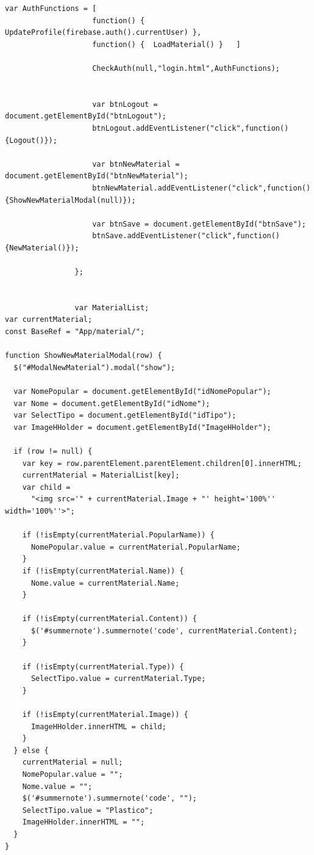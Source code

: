 \documentclass[
	12pt,				%
	openright,			%
	twoside,			%
	a4paper,			%
	english,			%
	french,				%
	spanish,			%
	brazil				%
	]{abntex2}
\begin{document}
\begin{apendicesenv}
\begin{lstlisting}[numbers=none,
basicstyle=\small,
caption={Material.js},
title={Material.js},
label={Material.js}]
                    var AuthFunctions = [   
                    function() {  UpdateProfile(firebase.auth().currentUser) },
                    function() {  LoadMaterial() }   ]                    
                    
                    CheckAuth(null,"login.html",AuthFunctions);                   
                    
                    
                    var btnLogout = document.getElementById("btnLogout");
                    btnLogout.addEventListener("click",function(){Logout()}); 
                    
                    var btnNewMaterial = document.getElementById("btnNewMaterial");
                    btnNewMaterial.addEventListener("click",function(){ShowNewMaterialModal(null)}); 
                    
                    var btnSave = document.getElementById("btnSave");
                    btnSave.addEventListener("click",function(){NewMaterial()});    
                    
                };


                var MaterialList;
var currentMaterial;
const BaseRef = "App/material/";

function ShowNewMaterialModal(row) {
  $("#ModalNewMaterial").modal("show");

  var NomePopular = document.getElementById("idNomePopular");
  var Nome = document.getElementById("idNome"); 
  var SelectTipo = document.getElementById("idTipo");
  var ImageHHolder = document.getElementById("ImageHHolder");

  if (row != null) {
    var key = row.parentElement.parentElement.children[0].innerHTML;
    currentMaterial = MaterialList[key];
    var child =
      "<img src='" + currentMaterial.Image + "' height='100%'' width='100%''>";

    if (!isEmpty(currentMaterial.PopularName)) {
      NomePopular.value = currentMaterial.PopularName;
    }
    if (!isEmpty(currentMaterial.Name)) {
      Nome.value = currentMaterial.Name;
    }

    if (!isEmpty(currentMaterial.Content)) {      
      $('#summernote').summernote('code', currentMaterial.Content);
    }

    if (!isEmpty(currentMaterial.Type)) {
      SelectTipo.value = currentMaterial.Type;
    }

    if (!isEmpty(currentMaterial.Image)) {
      ImageHHolder.innerHTML = child;
    }
  } else {
    currentMaterial = null;
    NomePopular.value = "";
    Nome.value = "";
    $('#summernote').summernote('code', "");
    SelectTipo.value = "Plastico";
    ImageHHolder.innerHTML = "";
  }
}


\end{lstlisting}
\end{apendicesenv}
\end{document}
